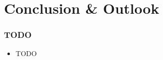 \section{Conclusion \& Outlook}
    \begin{frame}[t]
        \frametitle{TODO}
        
        \vspace{-0.5em}
        \begin{itemize}
            \item TODO
        \end{itemize}

        \onslide %
    \end{frame}
